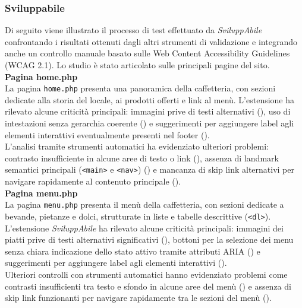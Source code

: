 \subsubsection{Sviluppabile}
\noindent Di seguito viene illustrato il processo di test effettuato da \textit{SviluppAbile} confrontando i risultati ottenuti dagli altri strumenti di validazione e integrando anche un controllo manuale basato sulle Web Content Accessibility Guidelines (WCAG 2.1). Lo studio è stato articolato sulle principali pagine del sito.\\

\noindent \textbf{Pagina home.php}\\
La pagina \texttt{home.php} presenta una panoramica della caffetteria, con sezioni dedicate alla storia del locale, ai prodotti offerti e link al menù. L’estensione ha rilevato alcune criticità principali: immagini prive di testi alternativi ({}), uso di intestazioni senza gerarchia coerente ({}) e suggerimenti per aggiungere label agli elementi interattivi eventualmente presenti nel footer ({}).\\
L’analisi tramite strumenti automatici ha evidenziato ulteriori problemi: contrasto insufficiente in alcune aree di testo o link ({}), assenza di landmark semantici principali (\texttt{<main>} e \texttt{<nav>}) ({}) e mancanza di skip link alternativi per navigare rapidamente al contenuto principale ({}).\\

\noindent \textbf{Pagina menu.php}\\
La pagina \texttt{menu.php} presenta il menù della caffetteria, con sezioni dedicate a bevande, pietanze e dolci, strutturate in liste e tabelle descrittive (\texttt{<dl>}). 
L’estensione \textit{SviluppAbile} ha rilevato alcune criticità principali: immagini dei piatti prive di testi alternativi significativi ({}), bottoni per la selezione dei menu senza chiara indicazione dello stato attivo tramite attributi ARIA ({}) e suggerimenti per aggiungere label agli elementi interattivi ({}).\\
Ulteriori controlli con strumenti automatici hanno evidenziato problemi come contrasti insufficienti tra testo e sfondo in alcune aree del menù ({}) e assenza di skip link funzionanti per navigare rapidamente tra le sezioni del menù ({}).\\

